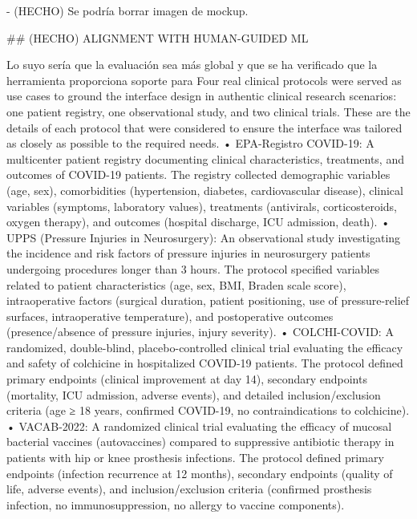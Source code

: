 - (HECHO) Se podría borrar imagen de mockup.


## (HECHO) ALIGNMENT WITH HUMAN-GUIDED ML

Lo suyo sería que la evaluación sea más global y que se ha verificado que la herramienta proporciona soporte para Four real clinical protocols were served as use cases to ground the interface design in authentic clinical research scenarios:
one patient registry, one observational study, and two clinical trials. These are the details of each protocol that were considered
to ensure the interface was tailored as closely as possible to the required needs.
• EPA-Registro COVID-19: A multicenter patient registry documenting clinical characteristics, treatments, and outcomes
of COVID-19 patients. The registry collected demographic variables (age, sex), comorbidities (hypertension, diabetes,
cardiovascular disease), clinical variables (symptoms, laboratory values), treatments (antivirals, corticosteroids, oxygen
therapy), and outcomes (hospital discharge, ICU admission, death).
• UPPS (Pressure Injuries in Neurosurgery): An observational study investigating the incidence and risk factors of
pressure injuries in neurosurgery patients undergoing procedures longer than 3 hours. The protocol specified variables
related to patient characteristics (age, sex, BMI, Braden scale score), intraoperative factors (surgical duration, patient
positioning, use of pressure-relief surfaces, intraoperative temperature), and postoperative outcomes (presence/absence of
pressure injuries, injury severity).
• COLCHI-COVID: A randomized, double-blind, placebo-controlled clinical trial evaluating the efficacy and safety of
colchicine in hospitalized COVID-19 patients. The protocol defined primary endpoints (clinical improvement at day 14),
secondary endpoints (mortality, ICU admission, adverse events), and detailed inclusion/exclusion criteria (age ≥ 18 years,
confirmed COVID-19, no contraindications to colchicine).
• VACAB-2022: A randomized clinical trial evaluating the efficacy of mucosal bacterial vaccines (autovaccines) compared
to suppressive antibiotic therapy in patients with hip or knee prosthesis infections. The protocol defined primary endpoints
(infection recurrence at 12 months), secondary endpoints (quality of life, adverse events), and inclusion/exclusion criteria
(confirmed prosthesis infection, no immunosuppression, no allergy to vaccine components).